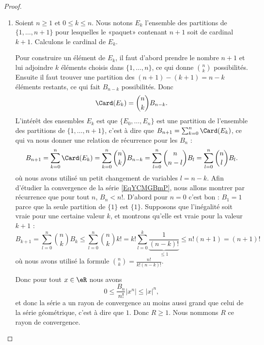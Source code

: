 \begin{proof}
    \begin{enumerate}
        \item
            Soient \( n\geq 1\) et \( 0\leq k\leq n\). Nous notons \( E_k\) l'ensemble des partitions de \( \{ 1,\ldots, n+1 \}\) pour lesquelles le «paquet» contenant \( n+1\) soit de cardinal \( k+1\). Calculons le cardinal de \( E_k\).

            Pour construire un élément de \( E_k\), il faut d'abord prendre le nombre \( n+1\) et lui adjoindre \( k\) éléments choisis dans \( \{ 1,\ldots, n \}\), ce qui donne \( n\choose k\) possibilités. Ensuite il faut trouver une partition des \( (n+1)-(k+1)=n-k\) éléments restants, ce qui fait \( B_{n-k}\) possibilités. Donc
            \begin{equation}
                \Card(E_k)={n\choose k}B_{n-k}.
            \end{equation}
            L'intérêt des ensembles \( E_k\) est que \( \{ E_0,\ldots, E_n \}\) est une partition de l'ensemble des partitions de \( \{ 1,\ldots, n+1 \}\), c'est à dire que \( B_{n+1}=\sum_{k=0}^n\Card(E_k)\), ce qui va nous donner une relation de récurrence pour les \( B_n\) :
\begin{equation}
                    B_{n+1}=\sum_{k=0}^n\Card(E_k)
                   =\sum_{k=0}^n{n\choose k}B_{n-k}
                    =\sum_{l=0}^n{n\choose n-l}B_l 
                    =\sum_{l=0}^n{n\choose l}B_l.
\end{equation}
où nous avons utilisé un petit changement de variables \( l=n-k\). Afin d'étudier la convergence de la série \eqref{EqYCMGBmP}, nous allons montrer par récurrence que pour tout \( n\), \( B_n<n!\). D'abord pour \( n=0\) c'est bon : \( B_1=1\) parce que la seule partition de \( \{ 1 \}\) est \( \{ 1 \}\). Supposons que l'inégalité soit vraie pour une certaine valeur \( k\), et montrons qu'elle est vraie pour la valeur \( k+1\) :
\begin{equation}
                    B_{k+1}=\sum_{l=0}^n{n\choose k}B_k
                   \leq \sum_{l=0}^n{n\choose k}k!
                    =k!\sum_{l=0}^k\underbrace{\frac{1}{ (n-k)! }}_{\leq 1}
                    \leq n!(n+1)
                    =(n+1)!
\end{equation}
            où nous avons utilisé la formule \( {n\choose k}=\frac{ n! }{ k!(n-k)! }\).

            Donc pour tout \( x\in \eR\) nous avons
            \begin{equation}
                0\leq \frac{ B_n }{ n! }| x^n |\leq | x |^n,
            \end{equation}
            et donc la série a un rayon de convergence au moins aussi grand que celui de la série géométrique, c'est à dire que \( 1\). Donc \( R\geq 1\). Nous nommons \( R\) ce rayon de convergence.


\end{enumerate}
\end{proof}
